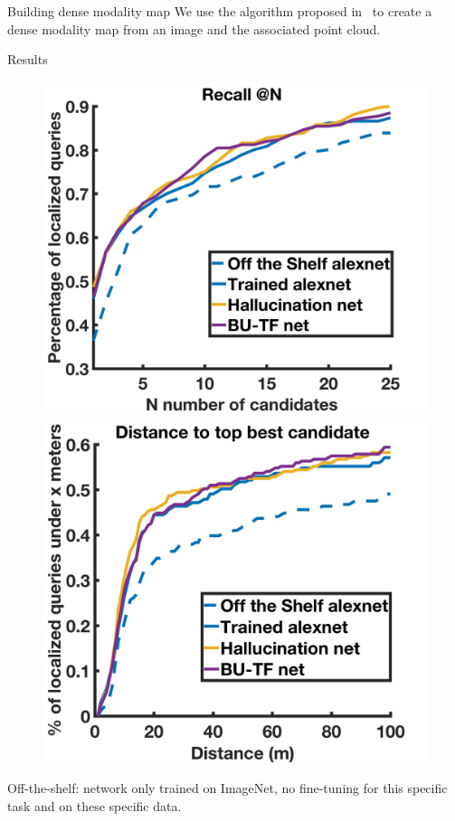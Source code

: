 \begin{frame}{Building dense modality map}
	We use the algorithm proposed in~\cite{Bevilacqua2017} to create a dense modality map from an image and the associated point cloud.
\end{frame}

\begin{frame}{Results}
	\begin{figure}[t]
		\centering %
		\includegraphics[width=0.499\linewidth]{images/global_res/recall.jpg}\hfill
		\includegraphics[width=0.499\linewidth]{images/global_res/dist.jpg}			
	\end{figure}	
	Off-the-shelf: network only trained on ImageNet, no fine-tuning for this specific task and on these specific data.
\end{frame}

